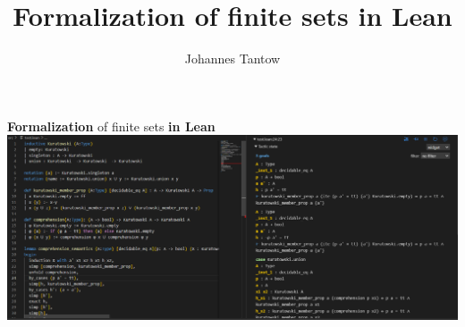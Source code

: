 \documentclass{beamer}
\title[Finite sets]{Formalization of finite sets in Lean}
\author[J. Tantow]{Johannes Tantow}
\begin{document}
    \maketitle
    \begin{frame}[fragile]{\textbf{Formalization} of finite sets \textbf{in Lean}}
        \includegraphics[width=1\textwidth]{Lean_Preview.png}
    \end{frame}
\end{document}
